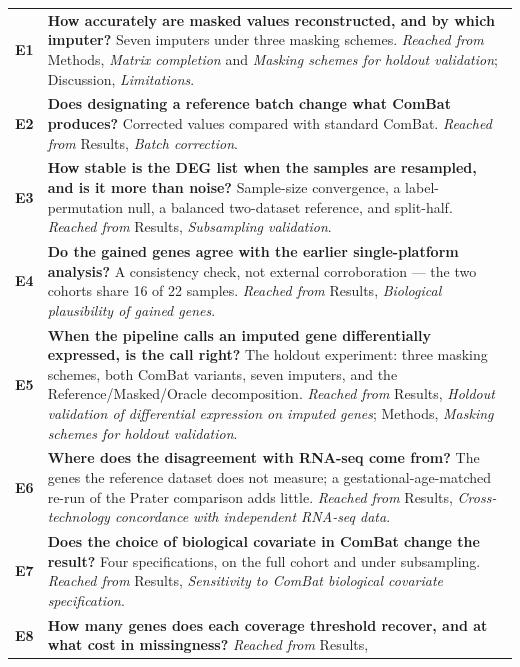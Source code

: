 \documentclass[11pt,a4paper]{article}
\begin{document}
\noindent
\begin{tabularx}{\textwidth}{@{}lX@{}}
\toprule
\textbf{E1} & \textbf{How accurately are masked values reconstructed, and by
  which imputer?} Seven imputers under three masking schemes.
  \emph{Reached from} Methods, \emph{Matrix completion} and
  \emph{Masking schemes for holdout validation}; Discussion,
  \emph{Limitations}. \\
\addlinespace
\textbf{E2} & \textbf{Does designating a reference batch change what ComBat
  produces?} Corrected values compared with standard ComBat.
  \emph{Reached from} Results, \emph{Batch correction}. \\
\addlinespace
\textbf{E3} & \textbf{How stable is the DEG list when the samples are
  resampled, and is it more than noise?} Sample-size convergence,
  a label-permutation null, a balanced two-dataset reference, and
  split-half.
  \emph{Reached from} Results, \emph{Subsampling validation}. \\
\addlinespace
\textbf{E4} & \textbf{Do the gained genes agree with the earlier
  single-platform analysis?} A consistency check, not external
  corroboration --- the two cohorts share 16 of 22 samples.
  \emph{Reached from} Results, \emph{Biological plausibility of gained genes}. \\
\addlinespace
\textbf{E5} & \textbf{When the pipeline calls an imputed gene differentially
  expressed, is the call right?} The holdout experiment: three masking
  schemes, both ComBat variants, seven imputers, and the
  Reference/Masked/Oracle decomposition. \emph{Reached from} Results,
  \emph{Holdout validation of differential expression on imputed genes};
  Methods, \emph{Masking schemes for holdout validation}. \\
\addlinespace
\textbf{E6} & \textbf{Where does the disagreement with RNA-seq come
  from?} The genes the reference dataset does not measure; a
  gestational-age-matched re-run of the Prater comparison adds little. \emph{Reached from} Results, \emph{Cross-technology
  concordance with independent RNA-seq data}. \\
\addlinespace
\textbf{E7} & \textbf{Does the choice of biological covariate in ComBat change
  the result?} Four specifications, on the full cohort and under subsampling.
  \emph{Reached from} Results, \emph{Sensitivity to ComBat biological
  covariate specification}. \\
\addlinespace
\textbf{E8} & \textbf{How many genes does each coverage threshold recover, and
  at what cost in missingness?} \emph{Reached from} Results,

\end{tabularx}
\end{document}
